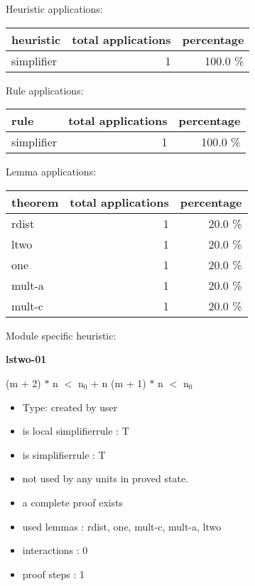 \documentclass[a4paper]{article}
\begin{document}
\medskip


Heuristic applications:

\begin{supertabular}{l|r|r}
heuristic	& total applications & percentage \\ \hline
simplifier & 1 & 100.0 \% \\

\end{supertabular}

Rule applications:

\begin{supertabular}{l|r|r}
rule	        & total applications & percentage \\ \hline
simplifier & 1 & 100.0 \% \\

\end{supertabular}

Lemma applications:

\begin{supertabular}{l|r|r}
theorem	        & total applications & percentage \\ \hline
rdist & 1 & 20.0 \% \\
ltwo & 1 & 20.0 \% \\
one & 1 & 20.0 \% \\
mult-a & 1 & 20.0 \% \\
mult-c & 1 & 20.0 \% \\

\end{supertabular}

Module specific heuristic:

\pagebreak

{\LARGE\bf lstwo-01}\label{lemma-lstwo-01}

\medskip

 \Fol (m + 2) $*$ n $<$ $\mbox{n}_{0}$ + n \Equiv (m + 1) $*$ n $<$ $\mbox{n}_{0}$

\begin{itemize}

\item Type: created by user

\item is local simplifierrule : T
\item is simplifierrule : T
\item not used by any units in proved state.
\item       a complete proof exists
\item       used lemmas  : rdist, one, mult-c, mult-a, ltwo
\item       interactions : 0
\item       proof steps  : 1
\end{itemize}
\end{document}

